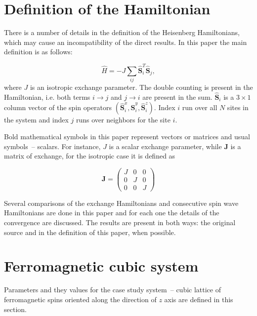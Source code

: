 \documentclass[a4paper,12pt]{article}
\begin{document}
    \section{Definition of the Hamiltonian}

        There is a number of details in the definition of the Heisenberg Hamiltonians, which may cause an incompatibility of the direct results. 
        In this paper the main definition is as follows:

        \begin{equation}
            \hat{H} = -J \sum_{ij} \hat{\mathbf{S}}_i^T \hat{\mathbf{S}}_j,
            \label{eq:hh-main}
        \end{equation}
        where $J$ is an isotropic exchange parameter. The double counting is present in the Hamiltonian, i.e. both terms $i\rightarrow j$ and $j \rightarrow i$ are present in the sum. 
        $\hat{\mathbf{S}}_i$ is a $3\times1$ column vector of the spin operators $(\hat{\mathbf{S}}_i^x, \hat{\mathbf{S}}_i^y, \hat{\mathbf{S}}_i^z)$. 
        Index $i$ run over all $N$ sites in the system and index $j$ runs over neighbors for the site $i$. 

        Bold mathematical symbols in this paper represent vectors or matrices and usual symbols~-- scalars. For instance, $J$ is a scalar exchange parameter, while $\mathbf{J}$ is a matrix of exchange, 
        for the isotropic case it is defined as

        \begin{equation}
            \mathbf{J} =
            \begin{pmatrix}
                J & 0 & 0 \\
                0 & J & 0 \\
                0 & 0 & J
            \end{pmatrix}
        \end{equation}

        Several comparisons of the exchange Hamiltonians and consecutive spin wave Hamiltonians are done in this paper 
        and for each one the details of the convergence are discussed. 
        The results are present in both ways: the original source and in the definition of this paper, when possible.

    \section{Ferromagnetic cubic system}

        Parameters and they values for the case study system~-- 
        cubic lattice of ferromagnetic spins oriented along the direction of $z$ axis are defined in this section.
\end{document}
